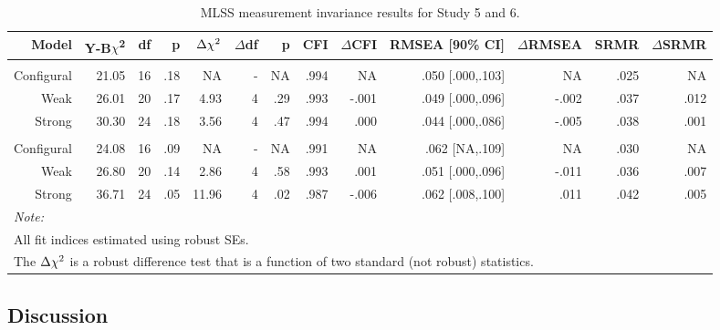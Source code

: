 \documentclass[
  12pt,
  a4paper,
]{book}
\begin{document}
\begin{landscape}\begin{table}

\caption{\label{tab:efficacy-mi}MLSS measurement invariance results for Study 5 and 6.}
\centering
\begin{tabular}[t]{rrrrrrrrrrrrr}
\toprule
Model & Y-B$\chi$\textsuperscript{2} & df & p & $\Delta\chi\textsuperscript{2}$ & $\Delta$df & p & CFI & $\Delta$CFI & RMSEA [90\% CI] & $\Delta$RMSEA & SRMR & $\Delta$SRMR\\
\midrule
\addlinespace[0.3em]
\multicolumn{13}{l}{\textbf{Study 5}}\\
\hspace{1em}Configural & 21.05 & 16 & .18 & NA & - & NA & .994 & NA & .050 [.000,.103] & NA & .025 & NA\\
\hspace{1em}Weak & 26.01 & 20 & .17 & 4.93 & 4 & .29 & .993 & -.001 & .049 [.000,.096] & -.002 & .037 & .012\\
\hspace{1em}Strong & 30.30 & 24 & .18 & 3.56 & 4 & .47 & .994 & .000 & .044 [.000,.086] & -.005 & .038 & .001\\
\addlinespace[0.3em]
\multicolumn{13}{l}{\textbf{Study 6}}\\
\hspace{1em}Configural & 24.08 & 16 & .09 & NA & - & NA & .991 & NA & .062 [NA,.109] & NA & .030 & NA\\
\hspace{1em}Weak & 26.80 & 20 & .14 & 2.86 & 4 & .58 & .993 & .001 & .051 [.000,.096] & -.011 & .036 & .007\\
\hspace{1em}Strong & 36.71 & 24 & .05 & 11.96 & 4 & .02 & .987 & -.006 & .062 [.008,.100] & .011 & .042 & .005\\
\bottomrule
\multicolumn{13}{l}{\textit{Note: }}\\
\multicolumn{13}{l}{All fit indices estimated using robust SEs.}\\
\multicolumn{13}{l}{The $\Delta\chi\textsuperscript{2}$ is a robust difference test that is a function of two standard (not robust) statistics.}\\
\end{tabular}
\end{table}
\end{landscape}

\hypertarget{study-5-discussion}{%
\subsection{Discussion}\label{study-5-discussion}}
\end{document}
